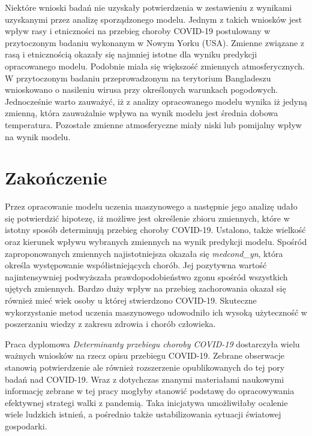 \documentclass[polish, twoside, 12pt, a4paper]{article}
\theoremstyle{definition}
\theoremstyle{plain}
\theoremstyle{remark}
\begin{document}
Niektóre wnioski badań nie uzyskały potwierdzenia w zestawieniu z wynikami uzyskanymi przez analizę sporządzonego modelu. Jednym z takich wniosków jest wpływ rasy i etniczności na przebieg choroby COVID-19 postulowany w przytoczonym badaniu wykonanym w Nowym Yorku (USA). Zmienne związane z rasą i etnicznością okazały się najmniej istotne dla wyniku predykcji opracowanego modelu. Podobnie miała się większość zmiennych atmosferycznych. W przytoczonym badaniu przeprowadzonym na terytorium Bangladeszu wnioskowano o nasileniu wirusa przy określonych warunkach pogodowych. Jednocześnie warto zauważyć, iż z analizy opracowanego modelu wynika iż jedyną zmienną, która zauważalnie wpływa na wynik modelu jest średnia dobowa temperatura. Pozostałe zmienne atmosferyczne miały niski lub pomijalny wpływ na wynik modelu.



\clearpage
\section{Zakończenie}

Przez opracowanie modelu uczenia maszynowego a następnie jego analizę udało się potwierdzić hipotezę, iż możliwe jest określenie zbioru zmiennych, które w istotny sposób determinują przebieg choroby COVID-19. Ustalono, także wielkość oraz kierunek wpływu wybranych zmiennych na wynik predykcji modelu. Spośród zaproponowanych zmiennych najistotniejsza okazała się \emph{medcond\_yn}, która określa występowanie współistniejących chorób. Jej pozytywna wartość najintensywniej podwyższała prawdopodobieństwo zgonu spośród wszystkich ujętych zmiennych. Bardzo duży wpływ na przebieg zachorowania okazał się również mieć wiek osoby u której stwierdzono COVID-19. Skuteczne wykorzystanie metod uczenia maszynowego udowodniło ich wysoką użyteczność w poszerzaniu wiedzy z zakresu zdrowia i chorób człowieka.

Praca dyplomowa \emph{Determinanty przebiegu choroby COVID-19} dostarczyła wielu ważnych wniosków na rzecz opisu przebiegu COVID-19. Zebrane obserwacje stanowią potwierdzenie ale również rozszerzenie opublikowanych do tej pory badań nad COVID-19. Wraz z dotychczas znanymi materiałami naukowymi informację zebrane w tej pracy mogłyby stanowić podstawę do opracowywania efektywnej strategi walki z pandemią. Taka inicjatywa umożliwiłaby ocalenie wiele ludzkich istnień, a pośrednio także ustabilizowania sytuacji światowej gospodarki. 
\end{document}
